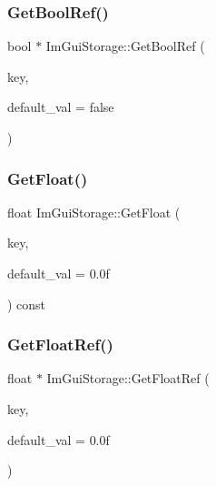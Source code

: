 \hypertarget{struct_im_gui_storage_aeb0d62100453d710bac5f6ad0a6e6a2e}{}\label{struct_im_gui_storage_aeb0d62100453d710bac5f6ad0a6e6a2e} 
\subsubsection{\texorpdfstring{Get\+Bool\+Ref()}{GetBoolRef()}}
{\footnotesize\ttfamily bool $\ast$ Im\+Gui\+Storage\+::\+Get\+Bool\+Ref (\begin{DoxyParamCaption}\item[{Im\+Gui\+ID}]{key,  }\item[{bool}]{default\+\_\+val = {\ttfamily false} }\end{DoxyParamCaption})}

\hypertarget{struct_im_gui_storage_a0f51ef327f7e548d003b0e006967c1eb}{}\label{struct_im_gui_storage_a0f51ef327f7e548d003b0e006967c1eb} 
\subsubsection{\texorpdfstring{Get\+Float()}{GetFloat()}}
{\footnotesize\ttfamily float Im\+Gui\+Storage\+::\+Get\+Float (\begin{DoxyParamCaption}\item[{Im\+Gui\+ID}]{key,  }\item[{float}]{default\+\_\+val = {\ttfamily 0.0f} }\end{DoxyParamCaption}) const}

\hypertarget{struct_im_gui_storage_a4b51cc8c92c65d4224af65a8ce7752ee}{}\label{struct_im_gui_storage_a4b51cc8c92c65d4224af65a8ce7752ee} 
\subsubsection{\texorpdfstring{Get\+Float\+Ref()}{GetFloatRef()}}
{\footnotesize\ttfamily float $\ast$ Im\+Gui\+Storage\+::\+Get\+Float\+Ref (\begin{DoxyParamCaption}\item[{Im\+Gui\+ID}]{key,  }\item[{float}]{default\+\_\+val = {\ttfamily 0.0f} }\end{DoxyParamCaption})}

